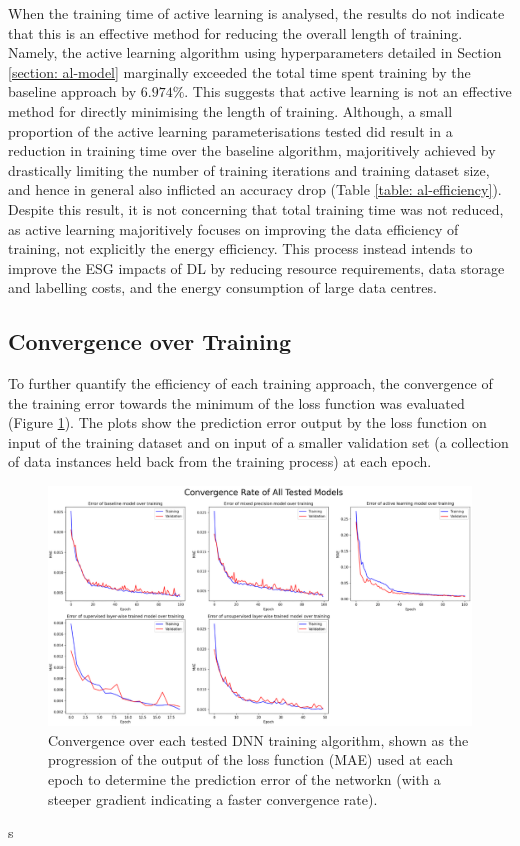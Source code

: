 \documentclass[a4paper, 11pt]{report}
\begin{document}
    When the training time of active learning is analysed, the results do not indicate that this is an effective method for reducing the overall length of training. Namely, the active learning algorithm using hyperparameters detailed in Section \ref{section: al-model} marginally exceeded the total time spent training by the baseline approach by $6.974\%$. This suggests that active learning is not an effective method for directly minimising the length of training. Although, a small proportion of the active learning parameterisations tested did result in a reduction in training time over the baseline algorithm, majoritively achieved by drastically limiting the number of training iterations and training dataset size, and hence in general also inflicted an accuracy drop (Table \ref{table: al-efficiency}). Despite this result, it is not concerning that total training time was not reduced, as active learning majoritively focuses on improving the data efficiency of training, not explicitly the energy efficiency. This process instead intends to improve the ESG impacts of DL by reducing resource requirements, data storage and labelling costs, and the energy consumption of large data centres.


    \subsection{Convergence over Training}

    To further quantify the efficiency of each training approach, the convergence of the training error towards the minimum of the loss function was evaluated (Figure \ref{fig: convergence}). The plots show the prediction error output by the loss function on input of the training dataset and on input of a smaller validation set (a collection of data instances held back from the training process) at each epoch.


    \begin{figure}[ht!]
        \centering
        \includegraphics[width=\textwidth]{results/all-training-loss.png}
        \caption{\centering Convergence over each tested DNN training algorithm, shown as the progression of the output of the loss function (MAE) used at each epoch to determine the prediction error of the networkn (with a steeper gradient indicating a faster convergence rate).}
        \label{fig: convergence}
    \end{figure}
s
\end{document}
